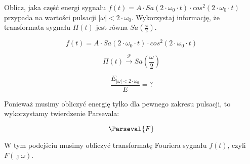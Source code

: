 \begin{task}
Oblicz, jaka część energi sygnału $f(t)=A \cdot Sa\left(2 \cdot \omega_0 \cdot t\right) \cdot cos^2\left(2 \cdot \omega_0 \cdot t\right)$ przypada na wartości pulsacji 
$\left| \omega \right| < 2 \cdot \omega_0$. Wykorzystaj informację, że transformata sygnału $\Pi(t)$ jest równa $Sa\left(\frac{\omega}{2}\right)$.

\begin{equation}
f(t) = A \cdot Sa\left(2 \cdot \omega_0 \cdot t\right) \cdot cos^2\left(2 \cdot \omega_0 \cdot t\right)
\end{equation}

\begin{equation}
\Pi(t) \xrightarrow{\mathcal F} Sa\left(\frac{\omega}{2}\right)
\end{equation}

\begin{equation}
\frac{E_{\left| \omega \right| < 2 \cdot \omega_0}}{E} = ?
\end{equation}

Ponieważ musimy obliczyć energię tylko dla pewnego zakresu pulsacji, to wykorzystamy twierdzenie Parsevala:

\begin{equation}
\Parseval{F}
\end{equation}

W tym podejściu musimy obliczyć transformatę Fouriera sygnału $f(t)$, czyli $F(\jmath \omega)$.


\end{task}

